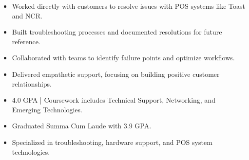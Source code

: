\par\smallskip
\noindent
\begin{minipage}{20cm}
  \begin{minipage}{9.75cm}
    \begin{itemize}
      \item Worked directly with customers to resolve issues with POS systems like Toast and NCR.
      \item Built troubleshooting processes and documented resolutions for future reference.
    \end{itemize}
  \end{minipage}
  \hfill
  \begin{minipage}{9.75cm}
    \begin{itemize}
      \item Collaborated with teams to identify failure points and optimize workflows.
      \item Delivered empathetic support, focusing on building positive customer relationships.
    \end{itemize}
  \end{minipage}
\end{minipage}
\par\smallskip
\divider

\begin{itemize}
  \item 4.0 GPA | Coursework includes Technical Support, Networking, and Emerging Technologies.
\end{itemize}
\divider

\begin{itemize}
  \item Graduated Summa Cum Laude with 3.9 GPA.
  \item Specialized in troubleshooting, hardware support, and POS system technologies.
\end{itemize}

\noindent
\begin{minipage}{20cm}
\end{minipage}


